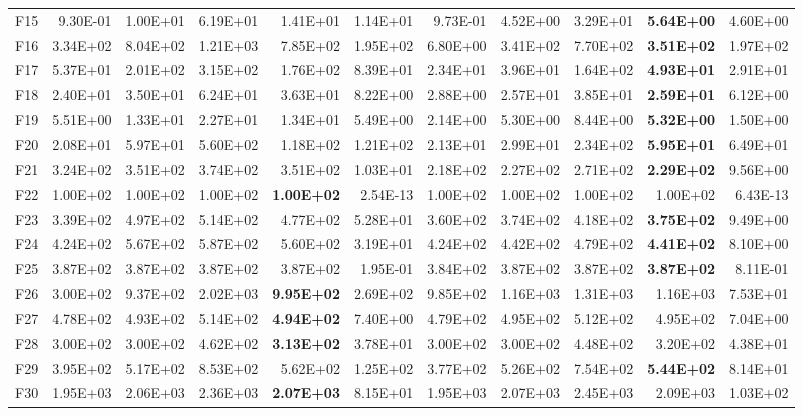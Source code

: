 \begin{tabular}{lrrrrrrrrrr}
F15 & 9.30E-01 & 1.00E+01 & 6.19E+01 & 1.41E+01 & 1.14E+01 & 9.73E-01 & 4.52E+00 & 3.29E+01 & \textbf{5.64E+00} & 4.60E+00 \\
F16 & 3.34E+02 & 8.04E+02 & 1.21E+03 & 7.85E+02 & 1.95E+02 & 6.80E+00 & 3.41E+02 & 7.70E+02 & \textbf{3.51E+02} & 1.97E+02 \\
F17 & 5.37E+01 & 2.01E+02 & 3.15E+02 & 1.76E+02 & 8.39E+01 & 2.34E+01 & 3.96E+01 & 1.64E+02 & \textbf{4.93E+01} & 2.91E+01 \\
F18 & 2.40E+01 & 3.50E+01 & 6.24E+01 & 3.63E+01 & 8.22E+00 & 2.88E+00 & 2.57E+01 & 3.85E+01 & \textbf{2.59E+01} & 6.12E+00 \\
F19 & 5.51E+00 & 1.33E+01 & 2.27E+01 & 1.34E+01 & 5.49E+00 & 2.14E+00 & 5.30E+00 & 8.44E+00 & \textbf{5.32E+00} & 1.50E+00 \\
F20 & 2.08E+01 & 5.97E+01 & 5.60E+02 & 1.18E+02 & 1.21E+02 & 2.13E+01 & 2.99E+01 & 2.34E+02 & \textbf{5.95E+01} & 6.49E+01 \\
F21 & 3.24E+02 & 3.51E+02 & 3.74E+02 & 3.51E+02 & 1.03E+01 & 2.18E+02 & 2.27E+02 & 2.71E+02 & \textbf{2.29E+02} & 9.56E+00 \\
F22 & 1.00E+02 & 1.00E+02 & 1.00E+02 & \textbf{1.00E+02} & 2.54E-13 & 1.00E+02 & 1.00E+02 & 1.00E+02 & 1.00E+02 & 6.43E-13 \\
F23 & 3.39E+02 & 4.97E+02 & 5.14E+02 & 4.77E+02 & 5.28E+01 & 3.60E+02 & 3.74E+02 & 4.18E+02 & \textbf{3.75E+02} & 9.49E+00 \\
F24 & 4.24E+02 & 5.67E+02 & 5.87E+02 & 5.60E+02 & 3.19E+01 & 4.24E+02 & 4.42E+02 & 4.79E+02 & \textbf{4.41E+02} & 8.10E+00 \\
F25 & 3.87E+02 & 3.87E+02 & 3.87E+02 & 3.87E+02 & 1.95E-01 & 3.84E+02 & 3.87E+02 & 3.87E+02 & \textbf{3.87E+02} & 8.11E-01 \\
F26 & 3.00E+02 & 9.37E+02 & 2.02E+03 & \textbf{9.95E+02} & 2.69E+02 & 9.85E+02 & 1.16E+03 & 1.31E+03 & 1.16E+03 & 7.53E+01 \\
F27 & 4.78E+02 & 4.93E+02 & 5.14E+02 & \textbf{4.94E+02} & 7.40E+00 & 4.79E+02 & 4.95E+02 & 5.12E+02 & 4.95E+02 & 7.04E+00 \\
F28 & 3.00E+02 & 3.00E+02 & 4.62E+02 & \textbf{3.13E+02} & 3.78E+01 & 3.00E+02 & 3.00E+02 & 4.48E+02 & 3.20E+02 & 4.38E+01 \\
F29 & 3.95E+02 & 5.17E+02 & 8.53E+02 & 5.62E+02 & 1.25E+02 & 3.77E+02 & 5.26E+02 & 7.54E+02 & \textbf{5.44E+02} & 8.14E+01 \\
F30 & 1.95E+03 & 2.06E+03 & 2.36E+03 & \textbf{2.07E+03} & 8.15E+01 & 1.95E+03 & 2.07E+03 & 2.45E+03 & 2.09E+03 & 1.03E+02 \\
\bottomrule
\end{tabular}
